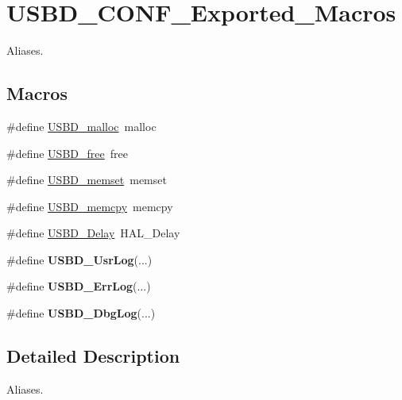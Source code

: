 \hypertarget{group__USBD__CONF__Exported__Macros}{}\section{U\+S\+B\+D\+\_\+\+C\+O\+N\+F\+\_\+\+Exported\+\_\+\+Macros}
\label{group__USBD__CONF__Exported__Macros}


Aliases.  


\subsection*{Macros}
\begin{DoxyCompactItemize}
\item 
\#define \hyperlink{group__USBD__CONF__Exported__Macros_ga35ff353194f56823357f503e546ccf4b}{U\+S\+B\+D\+\_\+malloc}~malloc
\item 
\#define \hyperlink{group__USBD__CONF__Exported__Macros_gab44fcf9b4d7bfbe8b1308eca76975fe5}{U\+S\+B\+D\+\_\+free}~free
\item 
\#define \hyperlink{group__USBD__CONF__Exported__Macros_gaf7b31857d15ef0abbd84e0e70a2b903f}{U\+S\+B\+D\+\_\+memset}~memset
\item 
\#define \hyperlink{group__USBD__CONF__Exported__Macros_ga18d9c17ef2afe7244b559ed428ca1e81}{U\+S\+B\+D\+\_\+memcpy}~memcpy
\item 
\#define \hyperlink{group__USBD__CONF__Exported__Macros_ga78993b66136329032c26d0c13a78e963}{U\+S\+B\+D\+\_\+\+Delay}~H\+A\+L\+\_\+\+Delay
\item 
\mbox{\label{group__USBD__CONF__Exported__Macros_gad0adad09bbf4f06418659a39edc0f6c6}} 
\#define {\bfseries U\+S\+B\+D\+\_\+\+Usr\+Log}(...)
\item 
\mbox{\label{group__USBD__CONF__Exported__Macros_ga077a76b66987212e70c3c4db2ca73a8b}} 
\#define {\bfseries U\+S\+B\+D\+\_\+\+Err\+Log}(...)
\item 
\mbox{\label{group__USBD__CONF__Exported__Macros_ga009d0ba418c356a4668fac6115b07ac5}} 
\#define {\bfseries U\+S\+B\+D\+\_\+\+Dbg\+Log}(...)
\end{DoxyCompactItemize}


\subsection{Detailed Description}
Aliases. 



